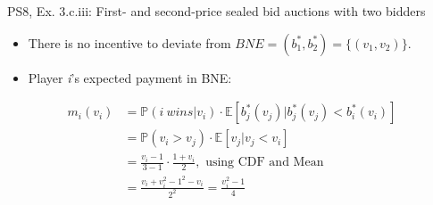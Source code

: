 \begin{frame}{PS8, Ex. 3.c.iii: First- and second-price sealed bid auctions with two bidders}
\begin{multicols}{2}
\begin{itemize}
        \item[(ii)] There is no incentive to deviate from $BNE=(b_1^*,b_2^*)=\{(v_1,v_2)\}$.
        \item[(iii)] Player \textit{i}'s expected payment in BNE:
      \end{itemize}
      \vspace{-12pt}
      \begin{align*}
        m_i(v_i)&=\mathbb{P}(i\ wins|v_i)\cdot\mathbb{E}[b_j^*(v_j)|b_j^*(v_j)<b_i^*(v_i)]\\
                &=\mathbb{P}(v_i>v_j)\cdot\mathbb{E}[v_j|v_j<v_i]\\
                &=\frac{v_i-1}{3-1}\cdot\frac{1+v_i}{2},\text{ using CDF and Mean}\\
                &=\frac{v_i+v_i^2-1^2-v_i}{2^2}=\frac{v_i^2-1}{4}
      \end{align*}
      \vfill\null
    \end{multicols}
\end{frame}
